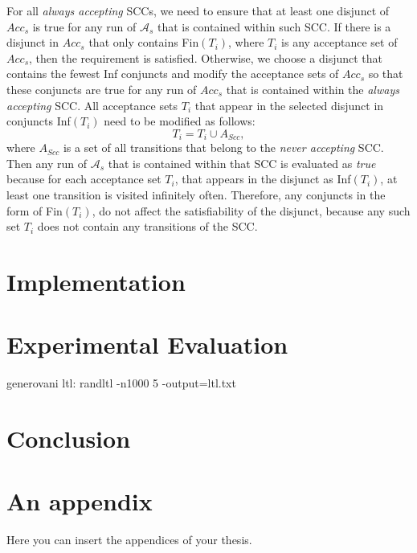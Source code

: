 \documentclass[
  digital, %
  twoside, %
  table,   %
  lof,     %
  lot,     %
]{fithesis3}
\begin{document}
For all \emph{always accepting} SCCs, we need to ensure that at least one disjunct of $Acc_s$ is true for any run of $\mathcal{A}_s$ that is contained within such SCC. If there is a disjunct in $Acc_s$ that only contains Fin$(T_i)$, where $T_i$ is any acceptance set of $Acc_s$, then the requirement is satisfied. Otherwise, we choose a disjunct that contains the fewest Inf conjuncts and modify the acceptance sets of $Acc_s$ so that these conjuncts are true for any run of $Acc_s$ that is contained within the \emph{always accepting} SCC. All acceptance sets $T_i$ that appear in the selected disjunct in conjuncts Inf$(T_i)$ need to be modified as follows:
\begin{equation*}
  T_i = T_i \cup A_{Scc},
\end{equation*}
where $A_{Scc}$ is a set of all transitions that belong to the \emph{never accepting} SCC. Then any run of $\mathcal{A}_s$ that is contained within that SCC is evaluated as \emph{true} because for each acceptance set $T_i$, that appears in the disjunct as Inf$(T_i)$, at least one transition is visited infinitely often. Therefore, any conjuncts in the form of Fin$(T_i)$, do not affect the satisfiability of the disjunct, because any such set $T_i$ does not contain any transitions of the SCC.

\chapter{Implementation}

\chapter{Experimental Evaluation}

generovani ltl: randltl -n1000 5 -output=ltl.txt

\chapter{Conclusion}

\printbibliography[heading=bibintoc]

\makeatletter\thesis@blocks@clear\makeatother
{}
{} 
\printindex

\appendix
\chapter{An appendix}
Here you can insert the appendices of your thesis.
\end{document}

